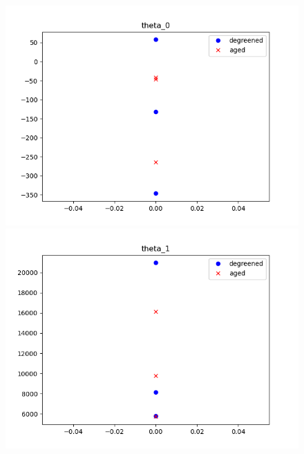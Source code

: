 \begin{figure}[H]
        \begin{minipage}{0.3\textwidth}
                \includegraphics[width = \textwidth]{./figs/figs_new_mdl/theta_0.png}
        \end{minipage}
        \begin{minipage}{0.3\textwidth}
                \includegraphics[width = \textwidth]{./figs/figs_new_mdl/theta_1.png}
        \end{minipage}
        \begin{minipage}{0.3\textwidth}

\end{minipage}
\end{figure}
